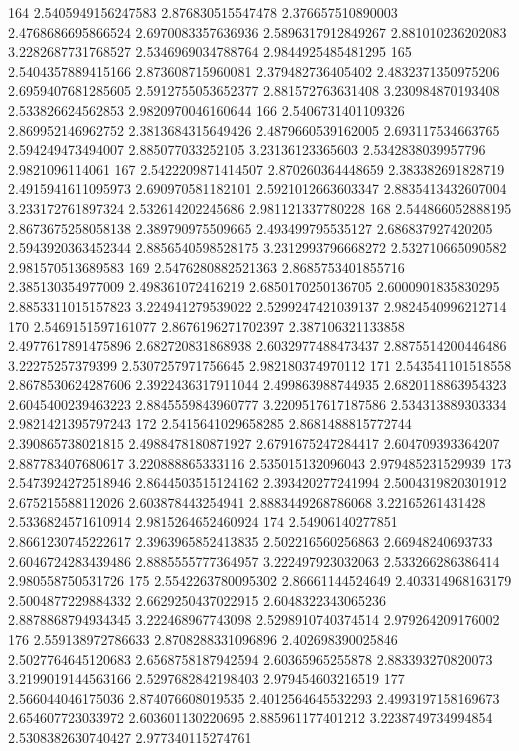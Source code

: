 164 2.5405949156247583 2.876830515547478 2.376657510890003 2.4768686695866524 2.6970083357636936 2.5896317912849267 2.881010236202083 3.2282687731768527 2.5346969034788764 2.9844925485481295
165 2.5404357889415166 2.873608715960081 2.379482736405402 2.4832371350975206 2.6959407681285605 2.5912755053652377 2.881572763631408 3.230984870193408 2.533826624562853 2.9820970046160644
166 2.5406731401109326 2.869952146962752 2.3813684315649426 2.4879660539162005 2.693117534663765 2.594249473494007 2.885077033252105 3.23136123365603 2.5342838039957796 2.9821096114061
167 2.5422209871414507 2.870260364448659 2.383382691828719 2.4915941611095973 2.690970581182101 2.5921012663603347 2.8835413432607004 3.233172761897324 2.532614202245686 2.981121337780228
168 2.544866052888195 2.8673675258058138 2.389790975509665 2.493499795535127 2.686837927420205 2.5943920363452344 2.8856540598528175 3.2312993796668272 2.532710665090582 2.981570513689583
169 2.5476280882521363 2.8685753401855716 2.385130354977009 2.498361072416219 2.6850170250136705 2.6000901835830295 2.8853311015157823 3.224941279539022 2.5299247421039137 2.9824540996212714
170 2.5469151597161077 2.8676196271702397 2.387106321133858 2.4977617891475896 2.682720831868938 2.6032977488473437 2.8875514200446486 3.22275257379399 2.5307257971756645 2.982180374970112
171 2.543541101518558 2.8678530624287606 2.3922436317911044 2.499863988744935 2.6820118863954323 2.6045400239463223 2.8845559843960777 3.2209517617187586 2.534313889303334 2.9821421395797243
172 2.5415641029658285 2.8681488815772744 2.390865738021815 2.4988478180871927 2.6791675247284417 2.604709393364207 2.887783407680617 3.220888865333116 2.535015132096043 2.979485231529939
173 2.5473924272518946 2.8644503515124162 2.393420277241994 2.5004319820301912 2.675215588112026 2.603878443254941 2.8883449268786068 3.22165261431428 2.5336824571610914 2.9815264652460924
174 2.54906140277851 2.8661230745222617 2.3963965852413835 2.502216560256863 2.66948240693733 2.6046724283439486 2.8885555777364957 3.222497923032063 2.533266286386414 2.980558750531726
175 2.5542263780095302 2.86661144524649 2.403314968163179 2.5004877229884332 2.6629250437022915 2.6048322343065236 2.8878868794934345 3.222468967743098 2.5298910740374514 2.979264209176002
176 2.559138972786633 2.8708288331096896 2.402698390025846 2.5027764645120683 2.6568758187942594 2.60365965255878 2.883393270820073 3.2199019144563166 2.5297682842198403 2.979454603216519
177 2.566044046175036 2.874076608019535 2.4012564645532293 2.4993197158169673 2.654607723033972 2.603601130220695 2.885961177401212 3.2238749734994854 2.5308382630740427 2.977340115274761
